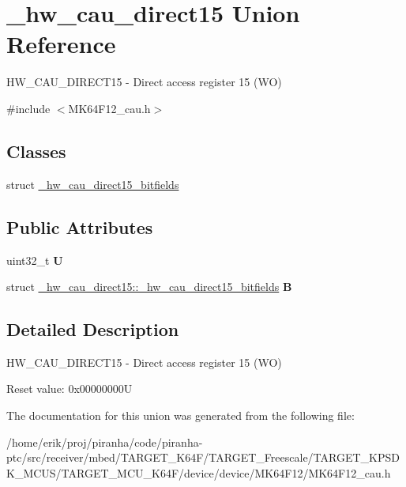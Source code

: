 \hypertarget{union__hw__cau__direct15}{}\section{\+\_\+hw\+\_\+cau\+\_\+direct15 Union Reference}
\label{union__hw__cau__direct15}


H\+W\+\_\+\+C\+A\+U\+\_\+\+D\+I\+R\+E\+C\+T15 -\/ Direct access register 15 (WO)  




{\ttfamily \#include $<$M\+K64\+F12\+\_\+cau.\+h$>$}

\subsection*{Classes}
\begin{DoxyCompactItemize}
\item 
struct \hyperlink{struct__hw__cau__direct15_1_1__hw__cau__direct15__bitfields}{\+\_\+hw\+\_\+cau\+\_\+direct15\+\_\+bitfields}
\end{DoxyCompactItemize}
\subsection*{Public Attributes}
\begin{DoxyCompactItemize}
\item 
uint32\+\_\+t {\bfseries U}\hypertarget{union__hw__cau__direct15_ae0069815809f9c4b223683c089df6a47}{}\label{union__hw__cau__direct15_ae0069815809f9c4b223683c089df6a47}

\item 
struct \hyperlink{struct__hw__cau__direct15_1_1__hw__cau__direct15__bitfields}{\+\_\+hw\+\_\+cau\+\_\+direct15\+::\+\_\+hw\+\_\+cau\+\_\+direct15\+\_\+bitfields} {\bfseries B}\hypertarget{union__hw__cau__direct15_ace9b487a6e4278aa2ba9c2d0b9ef4795}{}\label{union__hw__cau__direct15_ace9b487a6e4278aa2ba9c2d0b9ef4795}

\end{DoxyCompactItemize}


\subsection{Detailed Description}
H\+W\+\_\+\+C\+A\+U\+\_\+\+D\+I\+R\+E\+C\+T15 -\/ Direct access register 15 (WO) 

Reset value\+: 0x00000000U 

The documentation for this union was generated from the following file\+:\begin{DoxyCompactItemize}
\item 
/home/erik/proj/piranha/code/piranha-\/ptc/src/receiver/mbed/\+T\+A\+R\+G\+E\+T\+\_\+\+K64\+F/\+T\+A\+R\+G\+E\+T\+\_\+\+Freescale/\+T\+A\+R\+G\+E\+T\+\_\+\+K\+P\+S\+D\+K\+\_\+\+M\+C\+U\+S/\+T\+A\+R\+G\+E\+T\+\_\+\+M\+C\+U\+\_\+\+K64\+F/device/device/\+M\+K64\+F12/M\+K64\+F12\+\_\+cau.\+h\end{DoxyCompactItemize}
